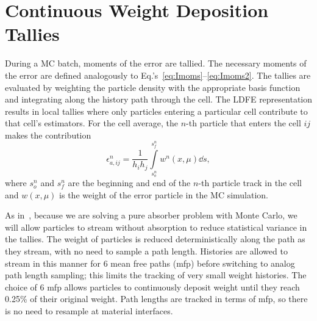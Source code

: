 \section{Continuous Weight Deposition Tallies}
\label{sec:tallies}

During a MC batch, moments of the error are tallied.  The necessary moments of the error are
defined analogously to Eq.'s~\eqref{eq:Imoms}--\eqref{eq:Imoms2}.  
The tallies are evaluated by weighting the particle density with the appropriate
basis function and integrating along the history path through the cell.  The LDFE
representation results in local tallies where only particles entering a particular cell
contribute to that cell's estimators.  For the cell average, the $n$-th
particle that enters the cell $ij$ makes the contribution
\begin{equation}\label{eq:avg_tal}
   \epsilon^n_{a,ij} = \frac{1}{h_ih_j} \int\limits_{s^n_o}^{s^n_f}  w^n(x,\mu) \dd s,
\end{equation}
where $s_o^n$ and $s_f^n$ are the beginning and end of the $n$-th particle track in the cell and $w(x,\mu)$ is
the weight of the error particle in the MC simulation. 

As in~\cite{park}, because we are solving a pure absorber problem with Monte Carlo, we will allow
particles to stream without absorption to reduce statistical 
variance in the tallies.  The weight of particles is reduced deterministically along
the path as they stream, with no need to sample a path length. Histories are allowed to stream in this manner for 6 mean free paths (mfp)
before switching to analog path length sampling; this limits the tracking of very small weight histories. The choice of 6 mfp allows particles to 
continuously deposit weight until they reach 0.25\% of their original weight.  Path lengths are tracked in terms of mfp, so there is no need to resample at material
interfaces.

